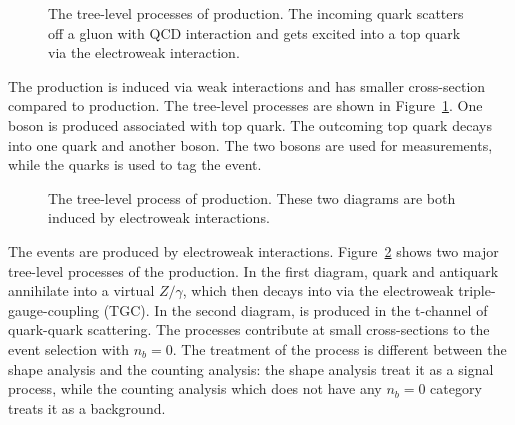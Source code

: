


\begin{figure}[ht]
    \centering
    
    \caption{The tree-level processes of \tW production. The incoming \PQb quark scatters off a gluon with QCD interaction and gets excited into a top quark via the electroweak interaction.}
    \label{fig:physics:ppCollision:tw}
\end{figure}
\noindent The \tW production is induced via weak interactions and has smaller cross-section compared to \ttbar production. The tree-level \tW processes are shown in Figure~\ref{fig:physics:ppCollision:tw}. One \PW boson is produced associated with top quark. The outcoming top quark decays into one \PQb quark and another \PW boson. The two \PW bosons are used for \PW measurements, while the \PQb quarks is used to tag the \tW event. 



\begin{figure}[ht]
    \centering
    
    \caption{The tree-level process of \WW production. These two diagrams are both induced by electroweak interactions. }
    \label{fig:physics:ppCollision:ww}
\end{figure}
\noindent The \WW events are produced by electroweak interactions. Figure~\ref{fig:physics:ppCollision:ww} shows two major tree-level processes of the \WW production. In the first diagram, quark and antiquark annihilate into a virtual $Z/\gamma$, which then decays into \WW via the electroweak triple-gauge-coupling (TGC). In the second diagram, \WW is produced in the t-channel of quark-quark scattering. The \WW processes contribute at small cross-sections to the event selection with $n_b=0$. The treatment of the \WW process is different between the shape analysis and the counting analysis: the shape analysis treat it as a signal process, while the counting analysis which does not have any $n_b=0$ category treats it as a background. 

